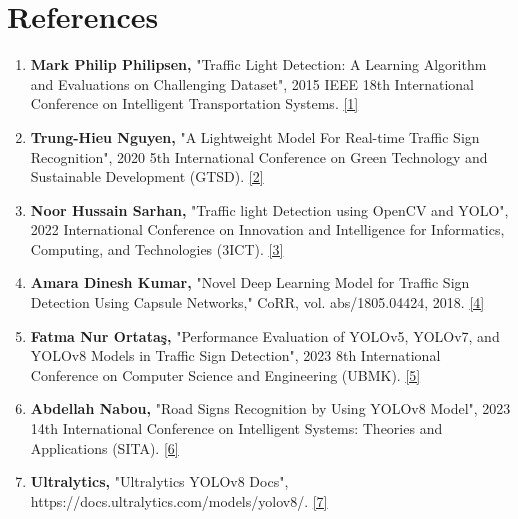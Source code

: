 \documentclass[12 pt]{report}
\begin{document}
\section*{References}

\begin{enumerate}
    \item \textbf{Mark Philip Philipsen,} "Traffic Light Detection: A Learning Algorithm and Evaluations on Challenging Dataset", 2015 IEEE 18th International Conference on Intelligent Transportation Systems.
    \href{https://doi.org/10.1109/ITSC.2015.378}{[1]}

    \item \textbf{Trung-Hieu Nguyen,} "A Lightweight Model For Real-time Traffic Sign Recognition", 2020 5th International Conference on Green Technology and Sustainable Development (GTSD).
    \href{https://doi.org/10.1109/GTSD50082.2020.9303072}{[2]}

    \item \textbf{Noor Hussain Sarhan,} "Traffic light Detection using OpenCV and YOLO", 2022 International Conference on Innovation and Intelligence for Informatics, Computing, and Technologies (3ICT).
    \href{https://doi.org/10.1109/3ICT56508.2022.9990723}{[3]}

    \item \textbf{Amara Dinesh Kumar,} "Novel Deep Learning Model for Traffic Sign Detection Using Capsule Networks," CoRR, vol. abs/1805.04424, 2018.
    \href{https://doi.org/10.48550/arXiv.1805.04424}{[4]}

    \item \textbf{Fatma Nur Ortataş,} "Performance Evaluation of YOLOv5, YOLOv7, and YOLOv8 Models in Traffic Sign Detection", 2023 8th International Conference on Computer Science and Engineering (UBMK).
    \href{https://doi.org/10.1109/UBMK59864.2023.10286611}{[5]}

    \item \textbf{Abdellah Nabou,} "Road Signs Recognition by Using YOLOv8 Model", 2023 14th International Conference on Intelligent Systems: Theories and Applications (SITA).
    \href{https://ieeexplore.ieee.org/document/10373723}{[6]}

    \item \textbf{Ultralytics,} "Ultralytics YOLOv8 Docs", https://docs.ultralytics.com/models/yolov8/.
    \href{https://www.ros.org/}{[7]}

\end{enumerate}
\end{document}
